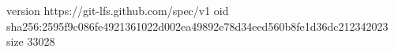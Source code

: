 version https://git-lfs.github.com/spec/v1
oid sha256:2595f9c086fe4921361022d002ea49892e78d34eed560b8fe1d36dc212342023
size 33028
